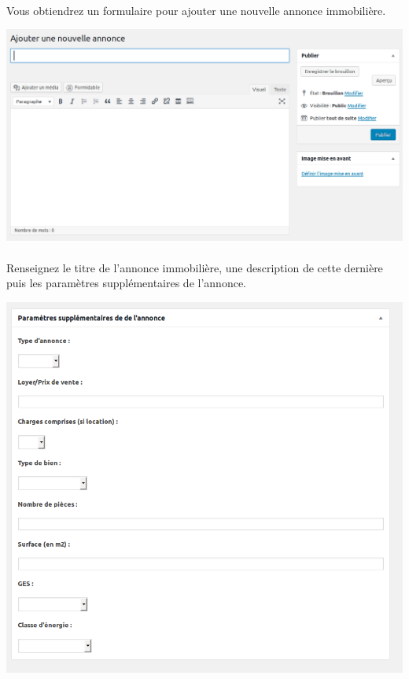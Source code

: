 \documentclass[10pt,a4paper]{article}
\begin{document}
\paragraph{}Vous obtiendrez un formulaire pour ajouter une nouvelle annonce immobilière.
\begin{center}
\includegraphics[scale=0.2]{img/0317.png}
\end{center}
\paragraph{}Renseignez le titre de l'annonce immobilière, une description de cette dernière puis les paramètres supplémentaires de l'annonce.
\begin{center}
\includegraphics[scale=0.3]{img/0318.png}
\end{center}
\end{document}
